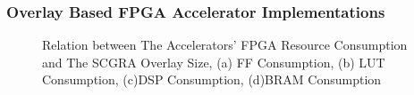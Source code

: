 \documentclass[accentcolor=tud1a,colorbacktitle,inverttitle,landscape,german,presentation,t]{tudbeamer}
\begin{document}
  \begin{frame}
  \frametitle{Overlay Based FPGA Accelerator Implementations}
  \begin{figure}[tb]
  \centering
    \hfill
    \caption{Relation between The Accelerators' FPGA Resource Consumption and The SCGRA Overlay Size, 
    (a) FF Consumption, (b) LUT Consumption, (c)DSP Consumption, (d)BRAM Consumption}
    \label{fig:SCGRA-Overhead}
  \end{figure}
  \end{frame}
\end{document}
